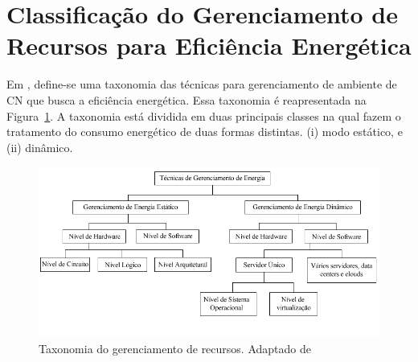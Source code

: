 \documentclass[tcc,capa]{texufpel}
\begin{document}




\section{Classificação do Gerenciamento de Recursos para Eficiência Energética}

Em \cite{beloglazov2013energy}, define-se uma taxonomia das técnicas para gerenciamento de ambiente de CN que busca a eficiência energética. Essa taxonomia é reapresentada na Figura~\ref{fig:taxonomiaenergetica}. A taxonomia está dividida em duas principais classes  na qual fazem o tratamento do consumo energético de duas formas distintas. (i) modo estático, e (ii) dinâmico. 

\begin{figure}[!htb]
   \centering
    \includegraphics[scale = 0.78]{images/taxonomia/taxonomiaEnergetica.png}
    \caption{Taxonomia do gerenciamento de recursos. Adaptado de  \cite{beloglazov2013energy}}
    \label{fig:taxonomiaenergetica}
\end{figure}
\end{document}
